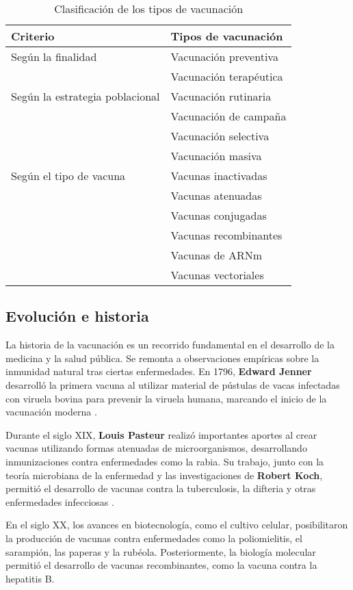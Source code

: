 \begin{enumerate}
\begin{table}[H]
\centering
\caption{Clasificación de los tipos de vacunación}
\label{tab:tipos_vacunacion}
\begin{tabularx}{\textwidth}{|l|X|}
\hline
\textbf{Criterio} & \textbf{Tipos de vacunación} \\
\hline
Según la finalidad &
Vacunación preventiva \\
& Vacunación terapéutica \\
\hline
Según la estrategia poblacional &
Vacunación rutinaria \\
& Vacunación de campaña \\
& Vacunación selectiva \\
& Vacunación masiva \\
\hline
Según el tipo de vacuna &
Vacunas inactivadas \\
& Vacunas atenuadas \\
& Vacunas conjugadas \\
& Vacunas recombinantes \\
& Vacunas de ARNm \\
& Vacunas vectoriales \\
\hline
\end{tabularx}
\end{table}


\subsection{Evolución e historia}
La historia de la vacunación es un recorrido fundamental en el desarrollo de la medicina y la salud pública. Se remonta a observaciones empíricas sobre la inmunidad natural tras ciertas enfermedades. En 1796, \textbf{Edward Jenner} desarrolló la primera vacuna al utilizar material de pústulas de vacas infectadas con viruela bovina para prevenir la viruela humana, marcando el inicio de la vacunación moderna \cite{damaso2018revisiting}.

Durante el siglo XIX, \textbf{Louis Pasteur} realizó importantes aportes al crear vacunas utilizando formas atenuadas de microorganismos, desarrollando inmunizaciones contra enfermedades como la rabia. Su trabajo, junto con la teoría microbiana de la enfermedad y las investigaciones de \textbf{Robert Koch}, permitió el desarrollo de vacunas contra la tuberculosis, la difteria y otras enfermedades infecciosas \cite{schwartz2022pasteurian}.

En el siglo XX, los avances en biotecnología, como el cultivo celular, posibilitaron la producción de vacunas contra enfermedades como la poliomielitis, el sarampión, las paperas y la rubéola. Posteriormente, la biología molecular permitió el desarrollo de vacunas recombinantes, como la vacuna contra la hepatitis B.


\end{enumerate}
